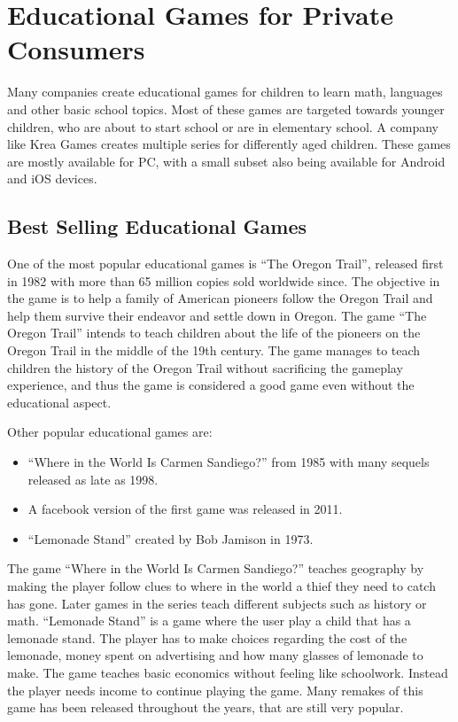 \section{Educational Games for Private Consumers}
\label{sec:privateconsumers}
Many companies create educational games for children to learn math, languages and other basic school topics.
Most of these games are targeted towards younger children, who are about to start school or are in elementary school.
A company like Krea Games \cite{kreagames} creates multiple series for differently aged children.
These games are mostly available for PC, with a small subset also being available for Android and iOS devices.

\subsection{Best Selling Educational Games}
One of the most popular educational games is ``The Oregon Trail'', released first in 1982 with more than 65 million copies sold worldwide since.\cite{oregontrail}
The objective in the game is to help a family of American pioneers follow the Oregon Trail and help them survive their endeavor and settle down in Oregon.
The game ``The Oregon Trail'' intends to teach children about the life of the pioneers on the Oregon Trail in the middle of the 19th century.
The game manages to teach children the history of the Oregon Trail without sacrificing the gameplay experience, and thus the game is considered a good game even without the educational aspect.\newline

Other popular educational games are:
\begin{itemize}
	\item ``Where in the World Is Carmen Sandiego?'' from 1985 with many sequels released as late as 1998.\cite{carmensandiego}
	\item A facebook version of the first game was released in 2011.
	\item ``Lemonade Stand'' created by Bob Jamison in 1973.\cite{lemonadestand}
\end{itemize}

The game ``Where in the World Is Carmen Sandiego?'' teaches geography by making the player follow clues to where in the world a thief they need to catch has gone.
Later games in the series teach different subjects such as history or math.
``Lemonade Stand'' is a game where the user play a child that has a lemonade stand.
The player has to make choices regarding the cost of the lemonade, money spent on advertising and how many glasses of lemonade to make.
The game teaches basic economics without feeling like schoolwork. Instead the player needs income to continue playing the game.
Many remakes of this game has been released throughout the years, that are still very popular.


